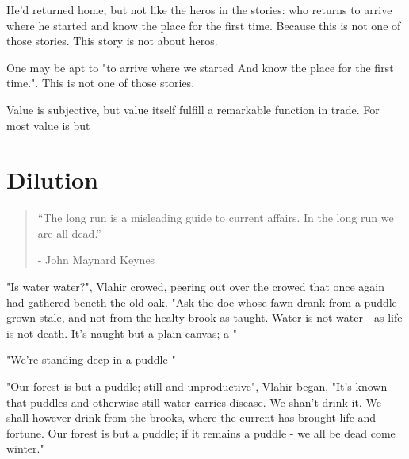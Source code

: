 \documentclass[smalldemyvopaper,11pt,twoside,onecolumn,openright,extrafontsizes]{memoir}
\begin{document}
He'd returned home, but not like the heros in the stories: who returns to arrive where he started and know the place for the first time. Because this is not one of those stories. This story is not about heros.

One may be apt to "to arrive where we started
And know the place for the first time.". This is not one of those stories.


Value is subjective, but value itself fulfill a remarkable function in trade. For most value is but 

\chapter{Dilution}

\vspace{-1.3cm}
\begin{localsize}{10}
	\begin{quote}
		“The long run is a misleading guide to current affairs. In the long run we are all dead.” 
		\begin{flushright}- John Maynard Keynes \end{flushright}
	\end{quote} 
\end{localsize}
\vspace{1cm}

"Is water water?", Vlahir crowed, peering out over the crowed that once again had gathered beneth the old oak. "Ask the doe whose fawn drank from a puddle grown stale, and not from the healty brook as taught. Water is not water - as life is not death. It's naught but a plain canvas; a " 

"We're standing deep in a puddle "

"Our forest is but a puddle; still and unproductive", Vlahir began, "It's known that puddles and otherwise still water carries disease. We shan't drink it.
We shall however drink from the brooks, where the current has brought life and fortune. Our forest is but a puddle; if it remains a puddle - we all be dead come winter."\\
\end{document}
